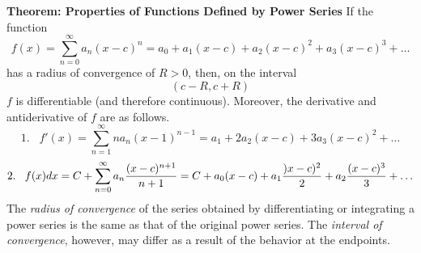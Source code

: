 \nopagenumbers
{\bf Theorem: Properties of Functions Defined by Power Series}
\vskip 6pt
If the function $$f(x)=\sum_{n=0}^\infty a_n(x-c)^n= a_0+a_1(x-c)+a_2(x-c)^2+a_3(x-c)^3+\ldots$$ has a radius of convergence of $R>0$, then, on the interval $$(c-R,c+R)$$ $f$ is differentiable (and therefore continuous). Moreover, the derivative and antiderivative of $f$ are as follows.
$$1.\;\;\; f'(x)=\sum_{n=1}^\infty na_n(x-1)^{n-1}=a_1+2a_2(x-c)+3a_3(x-c)^2+\ldots$$
$$2.\;\;\; f(x)dx= C+\sum_{n=0}^\infty a_n{(x-c)^{n+1}\over n+1}=C+a_0(x-c)+a_1{)x-c)^2\over 2}+a_2{(x-c)^3\over 3}+\ldots$$
The {\it radius of convergence} of the series obtained by differentiating or integrating a power series is the same as that of the original power series. The {\it interval of convergence}, however, may differ as a result of the behavior at the endpoints.
\vfill\eject
